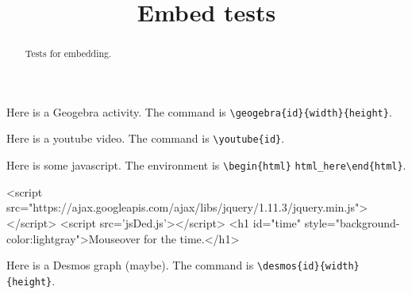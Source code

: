 \documentclass[handout]{ximera}
\title{Embed tests}
\begin{document}
	
\begin{abstract}
Tests for embedding.
\end{abstract}

\maketitle

Here is a Geogebra activity. The command is \verb!\geogebra{id}{width}{height}!.


Here is a youtube video. The command is \verb!\youtube{id}!.


Here is some javascript. The environment is \verb!\begin{html}! \verb!html_here!\verb!\end{html}!.

\begin{html}
<script src="https://ajax.googleapis.com/ajax/libs/jquery/1.11.3/jquery.min.js"></script>
<script src='jsDed.js'></script>
<h1 id="time" style="background-color:lightgray">Mouseover for the time.</h1>
\end{html}

Here is a Desmos graph (maybe). The command is \verb!\desmos{id}{width}{height}!.

\end{document}
